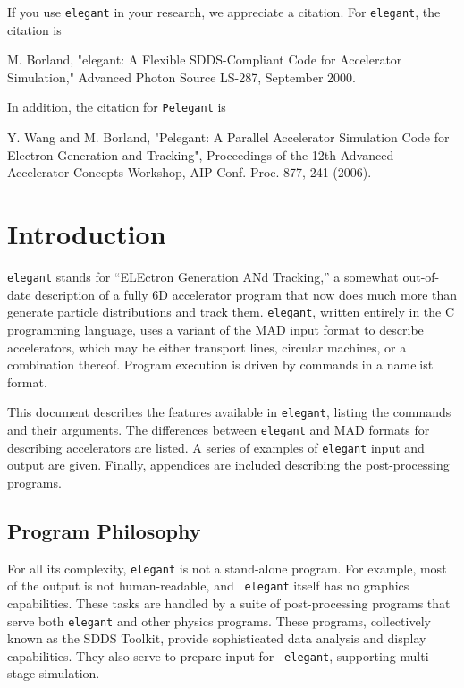 \documentclass[11pt]{article}
\begin{document}
If you use {\tt elegant} in your research, we appreciate a citation. For {\tt elegant}, the citation is
\begin{flushleft}
M. Borland, "elegant: A Flexible SDDS-Compliant Code for Accelerator Simulation," Advanced Photon Source LS-287, September 2000.
\end{flushleft}
In addition, the citation for {\tt Pelegant} is
\begin{flushleft}
Y. Wang and M. Borland, "Pelegant: A Parallel Accelerator Simulation Code for Electron Generation and Tracking", Proceedings of the 12th Advanced Accelerator
Concepts Workshop, AIP Conf. Proc. 877, 241 (2006).
\end{flushleft}

\section{Introduction}

{\tt elegant} stands for ``ELEctron Generation ANd Tracking,'' a
somewhat out-of-date description of a fully 6D accelerator program
that now does much more than generate particle distributions and track
them.  {\tt elegant}, written entirely in the C programming
language\cite{Kernighan}, uses a variant of the MAD\cite{MAD} input
format to describe accelerators, which may be either transport lines,
circular machines, or a combination thereof.  Program execution is
driven by commands in a namelist format.

This document describes the features available in {\tt elegant},
listing the commands and their arguments.  The differences between
{\tt elegant} and MAD formats for describing accelerators are listed.
A series of examples of {\tt elegant} input and output are given.
Finally, appendices are included describing the post-processing
programs.

\subsection{Program Philosophy}

For all its complexity, {\tt elegant} is not a stand-alone program.
For example, most of the output is not human-readable, and {\tt
elegant} itself has no graphics capabilities.  These tasks are handled
by a suite of post-processing programs that serve both {\tt elegant}
and other physics programs.  These programs, collectively known as the
SDDS Toolkit\cite{SDDS1,SDDS2}, provide sophisticated data analysis
and display capabilities.  They also serve to prepare input for {\tt
elegant}, supporting multi-stage simulation.
\end{document}

